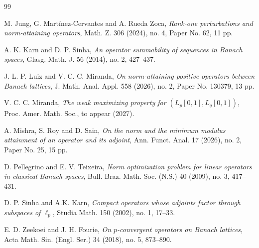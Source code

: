 \documentclass[12 pt]{article}%
\newtheorem{final remark}[theorem]{Final Remark}
\begin{document}
\begin{thebibliography}{99}
\vspace*{-0.8em}

 M. Jung, G. Martínez-Cervantes and A. Rueda Zoca, {\it Rank-one perturbations and norm-attaining operators}, Math. Z. 306 (2024), no. 4, Paper No. 62, 11 pp.

\vspace*{-0.8em}

 A. K. Karn and D. P. Sinha, {\it An operator summability of sequences in Banach spaces}, Glasg. Math. J. 56 (2014), no. 2, 427–437.

\vspace*{-0.8em}

 J. L. P. Luiz and V. C. C. Miranda, \textit{On norm-attaining positive operators between Banach lattices}, J. Math. Anal. Appl. 558 (2026), no. 2, Paper No. 130379, 13 pp.

\vspace*{-0.8em}

 V. C. C. Miranda, \textit{The weak maximizing property for $(L_p[0,1],L_q[0,1])$}, Proc. Amer. Math. Soc., to appear (2027).

\vspace*{-0.8em}

 A. Mishra, S. Roy and D. Sain, \textit{On the norm and the minimum modulus attainment of an operator and its adjoint}, Ann. Funct. Anal. 17 (2026), no. 2, Paper No. 25, 15 pp.

\vspace*{-0.8em}

 D. Pellegrino and E. V. Teixeira, \textit{Norm optimization problem for linear operators in classical Banach spaces}, Bull. Braz. Math. Soc. (N.S.) 40 (2009), no. 3, 417–431.

\vspace*{-0.8em}


 D. P. Sinha and A.K. Karn, \textit{Compact operators whose adjoints factor through subspaces of $\ell_p$}, Studia Math. 150 (2002), no. 1, 17–33.


\vspace*{-0.8em}

 E. D. Zeekoei and J. H. Fourie, \textit{On $p$-convergent operators on Banach lattices}, Acta Math. Sin. (Engl. Ser.) 34 (2018), no. 5, 873–890.
    
\end{thebibliography}
\end{document}
